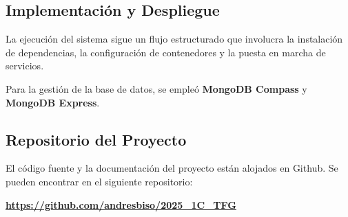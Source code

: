 \subsection{Implementación y Despliegue}
La ejecución del sistema sigue un flujo estructurado que involucra la
instalación de dependencias, la configuración de contenedores y la puesta en
marcha de servicios. 

Para la gestión de la base de datos, se empleó \textbf{MongoDB Compass} y
\textbf{MongoDB Express}.

\subsection{Repositorio del Proyecto}
El código fuente y la documentación del proyecto están alojados en Github. Se
pueden encontrar en el siguiente repositorio:

\begin{center}
	\textbf{\href{https://github.com/andresbiso/2025\_1C\_TFG}{https://github.com/andresbiso/2025\_1C\_TFG}}
\end{center}
